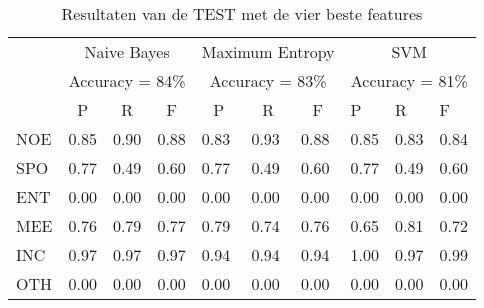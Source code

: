 {{\begin{table}[H]
\centering
\begin{tabular}{l|l|l|l|l|l|l|l|l|l|}
\cline{2-10}
                          & \multicolumn{3}{c|}{Naive Bayes}                                         & \multicolumn{3}{c|}{Maximum Entropy}                                     & \multicolumn{3}{c|}{SVM}             \\ \cline{2-10} 
                          & \multicolumn{3}{c|}{Accuracy = 84\%}                                     & \multicolumn{3}{c|}{Accuracy = 83\%}                                     & \multicolumn{3}{c|}{Accuracy = 81\%} \\ \cline{2-10} 
                          & \multicolumn{1}{c|}{P} & \multicolumn{1}{c|}{R} & \multicolumn{1}{c|}{F} & \multicolumn{1}{c|}{P} & \multicolumn{1}{c|}{R} & \multicolumn{1}{c|}{F} & P          & R          & F          \\ \hline
\multicolumn{1}{|l|}{NOE} & 0.85                   & 0.90                   & 0.88                   & 0.83                   & 0.93                   & 0.88                   & 0.85       & 0.83       & 0.84       \\ \hline
\multicolumn{1}{|l|}{SPO} & 0.77                   & 0.49                   & 0.60                   & 0.77                   & 0.49                   & 0.60                   & 0.77       & 0.49       & 0.60       \\ \hline
\multicolumn{1}{|l|}{ENT} & 0.00                   & 0.00                   & 0.00                   & 0.00                   & 0.00                   & 0.00                   & 0.00       & 0.00       & 0.00       \\ \hline
\multicolumn{1}{|l|}{MEE} & 0.76                   & 0.79                   & 0.77                   & 0.79                   & 0.74                   & 0.76                   & 0.65       & 0.81       & 0.72       \\ \hline
\multicolumn{1}{|l|}{INC} & 0.97                   & 0.97                   & 0.97                   & 0.94                   & 0.94                   & 0.94                   & 1.00       & 0.97       & 0.99       \\ \hline
\multicolumn{1}{|l|}{OTH} & 0.00                   & 0.00                   & 0.00                   & 0.00                   & 0.00                   & 0.00                   & 0.00       & 0.00       & 0.00       \\ \hline
\end{tabular}
\caption{Resultaten van de TEST met de vier beste features}\label{testclassifiers}
\end{table}

}}
